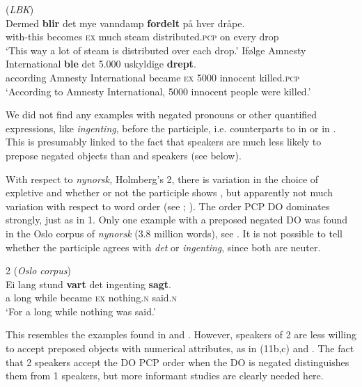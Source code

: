 \documentclass[output=paper]{LSP/langsci}
\begin{document}
\ea%
    \label{ex:engdahl:20}
     (\textit{LBK})\\
    \ea
\gll  Dermed     \textbf{blir}  det mye   vanndamp   \textbf{fordelt}      på hver dråpe. \\
with-this becomes  \textsc{ex} much steam distributed.\textsc{pcp} on every drop
\\
\glt ‘This way a lot of steam  is distributed over each drop.'
\ex\label{ex:engdahl:20b}
\gll     Ifølge  Amnesty International \textbf{ble} det   5.000   uskyldige   \textbf{drept}. \\
  according  Amnesty  International  became \textsc{ex}    5000  innocent    killed.\textsc{pcp}\\
  \glt ‘According to Amnesty International, 5000 innocent people were killed.'
\z\z

\noindent We did not find any examples with negated pronouns or other quantified expressions, like \textit{ingenting}, before the participle, i.e.  counterparts to  in  or  in . This is presumably linked to the fact that  speakers are much less likely to prepose negated objects than  and  speakers (see below).

    With respect to \textit{nynorsk,} Holmberg’s  2, there is variation in the choice of expletive and whether or not the participle shows , but apparently not much variation with respect to word order (see \citealt{Åfarli2009}; \citealt[218ff]{AaEtAl2014}). The order PCP DO dominates strongly, just as in  1. Only one example with a preposed negated DO was found in the Oslo corpus of \textit{nynorsk} (3.8 million words), see . It is not possible to tell whether the participle agrees with \textit{det} or \textit{ingenting}, since both are neuter.

\ea%
    \label{ex:engdahl:21}
     2 (\textit{Oslo corpus})\\
\gll   Ei   lang   stund   \textbf{vart}  det   ingenting   \textbf{sagt}.\\
a long while became  \textsc{ex} nothing.\textsc{n} said.\textsc{n}
 \\
 \glt ‘For a long while nothing was said.'
\z

\noindent This resembles the examples found in  and . However, speakers of  2 are less willing to accept preposed objects with numerical attributes, as in (11b,c) and .
The fact that  2 speakers accept the DO PCP order when the DO is negated distinguishes them from  1 speakers, but more informant studies are clearly needed here.
\end{document}
